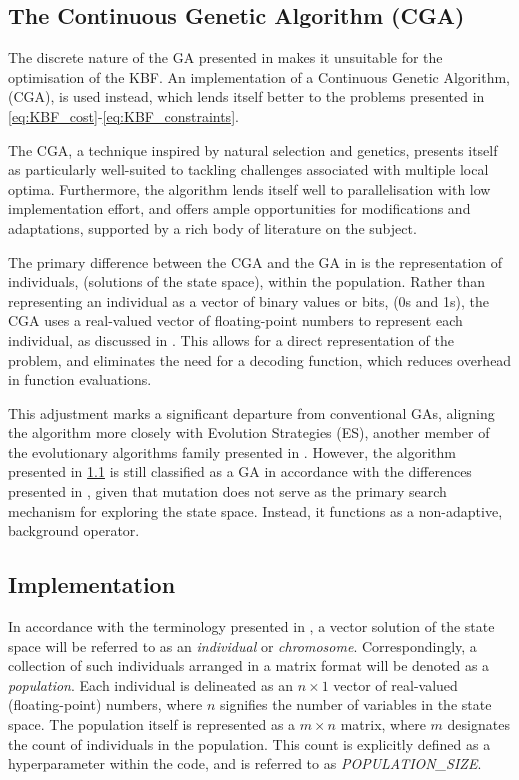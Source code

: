 \documentclass[10pt]{article}
\begin{document}
\begin{multicols}{2}
\section{The Continuous Genetic Algorithm (CGA)}
\label{sec:CGA}

The discrete nature of the GA presented in \cite{parks2023geneticalgorithms} makes it unsuitable for the optimisation of the KBF. An implementation of a Continuous Genetic Algorithm, (CGA), is used instead, which lends itself better to the problems presented in \ref{eq:KBF_cost}-\ref{eq:KBF_constraints}.

The CGA, a technique inspired by natural selection and genetics, presents itself as particularly well-suited to tackling challenges associated with multiple local optima. Furthermore, the algorithm lends itself well to parallelisation with low implementation effort, and offers ample opportunities for modifications and adaptations, supported by a rich body of literature on the subject.

The primary difference between the CGA and the GA in \cite{parks2023geneticalgorithms} is the representation of individuals, (solutions of the state space), within the population. Rather than representing an individual as a vector of binary values or bits, (0s and 1s), the CGA uses a real-valued vector of floating-point numbers to represent each individual, as discussed in \cite{PGA}. This allows for a direct representation of the problem, and eliminates the need for a decoding function, which reduces overhead in function evaluations.

This adjustment marks a significant departure from conventional GAs, aligning the algorithm more closely with Evolution Strategies (ES), another member of the evolutionary algorithms family presented in \cite{salimans2017evolution}. However, the algorithm presented in \ref{sec:CGA_implementation} is still classified as a GA in accordance with the differences presented in \cite{10.1007/BFb0029787}, given that mutation does not serve as the primary search mechanism for exploring the state space. Instead, it functions as a non-adaptive, background operator.

\subsection{Implementation}
\label{sec:CGA_implementation}

In accordance with the terminology presented in \cite{parks2023geneticalgorithms}, a vector solution of the state space will be referred to as an \textit{individual} or \textit{chromosome}. Correspondingly, a collection of such individuals arranged in a matrix format will be denoted as a \textit{population}. Each individual is delineated as an $n \times 1$ vector of real-valued (floating-point) numbers, where $n$ signifies the number of variables in the state space. The population itself is represented as a $m \times n$ matrix, where $m$ designates the count of individuals in the population. This count is explicitly defined as a hyperparameter within the code, and is referred to as \textit{POPULATION\_SIZE}.


\end{multicols}
\end{document}
